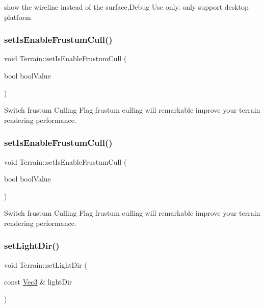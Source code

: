 show the wireline instead of the surface,Debug Use only.  only support desktop platform \mbox{\label{classTerrain_a27509ae8fd97c911b44f3f21d37761e1}} 
\subsubsection{\texorpdfstring{set\+Is\+Enable\+Frustum\+Cull()}{setIsEnableFrustumCull()}\hspace{0.1cm}{\footnotesize\ttfamily [1/2]}}
{\footnotesize\ttfamily void Terrain\+::set\+Is\+Enable\+Frustum\+Cull (\begin{DoxyParamCaption}\item[{bool}]{bool\+Value }\end{DoxyParamCaption})}

Switch frustum Culling Flag  frustum culling will remarkable improve your terrain rendering performance. \mbox{\label{classTerrain_a27509ae8fd97c911b44f3f21d37761e1}} 
\subsubsection{\texorpdfstring{set\+Is\+Enable\+Frustum\+Cull()}{setIsEnableFrustumCull()}\hspace{0.1cm}{\footnotesize\ttfamily [2/2]}}
{\footnotesize\ttfamily void Terrain\+::set\+Is\+Enable\+Frustum\+Cull (\begin{DoxyParamCaption}\item[{bool}]{bool\+Value }\end{DoxyParamCaption})}

Switch frustum Culling Flag  frustum culling will remarkable improve your terrain rendering performance. \mbox{\label{classTerrain_a4fb4d880c5033dcbf89f69ceddf5f8b0}} 
\subsubsection{\texorpdfstring{set\+Light\+Dir()}{setLightDir()}\hspace{0.1cm}{\footnotesize\ttfamily [1/2]}}
{\footnotesize\ttfamily void Terrain\+::set\+Light\+Dir (\begin{DoxyParamCaption}\item[{const \hyperlink{classVec3}{Vec3} \&}]{light\+Dir }\end{DoxyParamCaption})}

